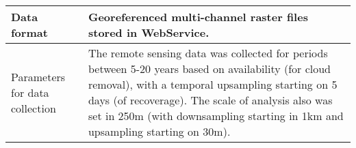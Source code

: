 \documentclass[times,final]{elsarticle}
\begin{document}
{\begin{longtable}{|p{33mm}|p{94mm}|}
\hline                         
Data format            & Georeferenced multi-channel raster files stored in WebService.\\
\hline                         
Parameters for         
data\newline 
collection             & The remote sensing data was collected for periods between                          5-20 years based on availability (for cloud removal), with a                         temporal upsampling starting on 5 days (of recoverage). The                           scale of analysis also was set in 250m (with downsampling                           starting in 1km and upsampling starting on 30m). \\  


\end{longtable}}
\end{document}
